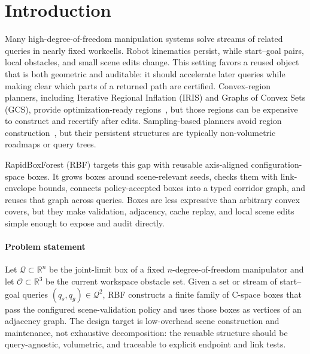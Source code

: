 \documentclass[journal]{IEEEtran}
\DeclareRobustCommand{\textsc}[1]{\textnormal{\MakeUppercase{#1}}}
\newcommand{\rbf}{\textsc{RBF}}
\newcommand{\Real}{\ensuremath{\mathbb{R}}}
\newcommand{\calO}{\ensuremath{\mathcal{O}}}
\newcommand{\Q}{\ensuremath{\mathcal{Q}}}
\newcommand{\cspace}{\mbox{C-space}}
\begin{document}
\section{Introduction}\label{sec:intro}

Many high-degree-of-freedom manipulation systems solve streams of related
queries in nearly fixed workcells. Robot kinematics persist, while start--goal
pairs, local obstacles, and small scene edits change. This setting favors a
reused object that is both geometric and auditable: it should accelerate later
queries while making clear which parts of a returned path are certified.
Convex-region planners, including Iterative Regional Inflation (IRIS) and Graphs
of Convex Sets (GCS), provide optimization-ready regions~\cite{deits2015computing,marcucci2023motion,
marcucci2024shortest}, but those regions can be expensive to construct and
recertify after edits. Sampling-based planners avoid region construction~\cite{lavalle2006planning,lavalle1998rapidly,
kavraki1996probabilistic,karaman2011sampling}, but their persistent structures
are typically non-volumetric roadmaps or query trees.

RapidBoxForest (\rbf{}) targets this gap with reusable axis-aligned
configuration-space boxes. It grows boxes around scene-relevant seeds, checks
them with link-envelope bounds, connects policy-accepted boxes into a typed
corridor graph, and reuses that graph across queries. Boxes are less expressive
than arbitrary convex covers, but they make validation, adjacency, cache replay,
and local scene edits simple enough to expose and audit directly.

\paragraph{Problem statement}
Let $\Q\subset\Real^n$ be the joint-limit box of a fixed
\(n\)-degree-of-freedom manipulator and let $\calO\subset\Real^3$ be the current
workspace obstacle set. Given a set or stream of start--goal queries
$(q_s,q_g)\in\Q^2$, \rbf{} constructs a finite family of \cspace{} boxes that
pass the configured scene-validation policy and uses those boxes as vertices of
an adjacency graph. The design target is low-overhead scene construction and
maintenance, not exhaustive decomposition: the reusable structure should be
query-agnostic, volumetric, and traceable to explicit endpoint and link tests.
\end{document}
